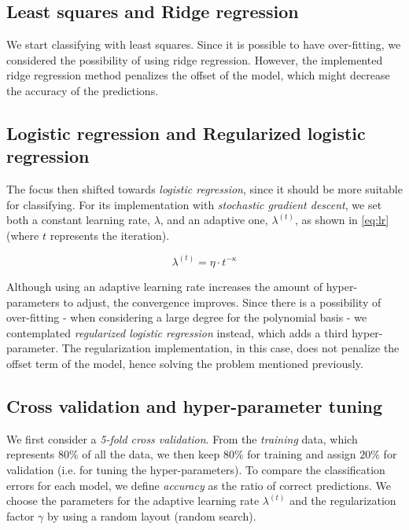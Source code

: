 \documentclass[10pt,conference,compsocconf]{IEEEtran}
\begin{document}
	\subsection{Least squares and Ridge regression} %
	\label{sub:least_squares_and_ridge_regression}
  	We start classifying with least squares. Since it is possible to have over-fitting, we considered the possibility of using ridge regression. However, the implemented ridge regression method penalizes the offset of the model, which might decrease the accuracy of the predictions.

	\subsection{Logistic regression and Regularized logistic regression} %
	\label{sub:logistic_regression_and_regularized_logistic_regression}
  	The focus then shifted towards \textit{logistic regression}, since it should be more suitable for classifying. For its implementation with \textit{stochastic gradient descent}, we set both a constant learning rate, $\lambda$, and an adaptive one, $\lambda^{(t)}$, as shown in \ref{eq:lr} (where $t$ represents the iteration).

  	\begin{equation}
    	\label{eq:lr}
      	\lambda^{(t)} = \eta \cdot t ^{- \kappa}
  	\end{equation}

  	Although using an adaptive learning rate increases the amount of hyper-parameters to adjust, the convergence improves.
  	Since there is a possibility of over-fitting - when considering a large degree for the polynomial basis - we contemplated  \textit{regularized logistic regression} instead, which adds a third hyper-parameter. The regularization implementation, in this case, does not penalize the offset term of the model, hence solving the problem mentioned previously.

	\subsection{Cross validation and hyper-parameter tuning} %
	\label{sub:cross_validation_and_hyperparameters_tuning}
  	We first consider a \textit{5-fold cross validation}. From the \emph{training} data, which represents $80\%$ of all the data, we then keep $80\%$ for training and assign $20\%$ for validation (i.e. for tuning the hyper-parameters). To compare the classification errors for each model, we define \emph{accuracy} as the ratio of correct predictions.	We choose the parameters for the adaptive learning rate $\lambda^{(t)}$ and the regularization factor $\gamma$ by using a random layout (random search).
\end{document}
